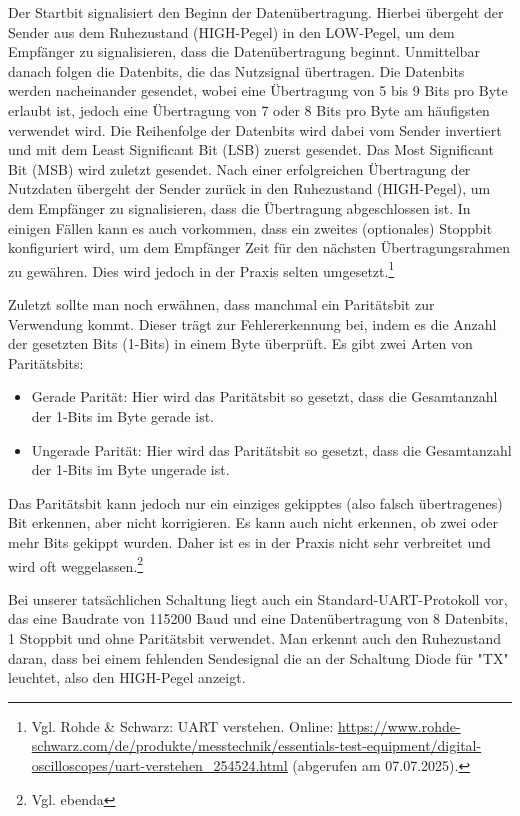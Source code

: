 Der Startbit signalisiert den Beginn der Datenübertragung. Hierbei übergeht der Sender aus dem Ruhezustand (HIGH-Pegel) in den LOW-Pegel, um dem Empfänger zu signalisieren, dass die Datenübertragung beginnt. 
Unmittelbar danach folgen die Datenbits, die das Nutzsignal übertragen. Die Datenbits werden nacheinander gesendet, wobei eine Übertragung von 5 bis 9 Bits pro Byte erlaubt ist, jedoch eine Übertragung von 7 oder 8 Bits pro Byte am häufigsten verwendet wird. Die Reihenfolge der Datenbits wird dabei vom Sender invertiert und mit dem Least Significant Bit (LSB) zuerst gesendet. Das Most Significant Bit (MSB) wird zuletzt gesendet.
Nach einer erfolgreichen Übertragung der Nutzdaten übergeht der Sender zurück in den Ruhezustand (HIGH-Pegel), um dem Empfänger zu signalisieren, dass die Übertragung abgeschlossen ist.
In einigen Fällen kann es auch vorkommen, dass ein zweites (optionales) Stoppbit konfiguriert wird, um dem Empfänger Zeit für den nächsten Übertragungsrahmen zu gewähren. Dies wird jedoch in der Praxis selten umgesetzt.\footnote{Vgl. Rohde \& Schwarz: UART verstehen. Online: \url{https://www.rohde-schwarz.com/de/produkte/messtechnik/essentials-test-equipment/digital-oscilloscopes/uart-verstehen_254524.html} (abgerufen am 07.07.2025).}

Zuletzt sollte man noch erwähnen, dass manchmal ein Paritätsbit zur Verwendung kommt. Dieser trägt zur Fehlererkennung bei, indem es die Anzahl der gesetzten Bits (1-Bits) in einem Byte überprüft. Es gibt zwei Arten von Paritätsbits: 
\begin{itemize}
    \item Gerade Parität: Hier wird das Paritätsbit so gesetzt, dass die Gesamtanzahl der 1-Bits im Byte gerade ist.
    \item Ungerade Parität: Hier wird das Paritätsbit so gesetzt, dass die Gesamtanzahl der 1-Bits im Byte ungerade ist.
\end{itemize}

Das Paritätsbit kann jedoch nur ein einziges gekipptes (also falsch übertragenes) Bit erkennen, aber nicht korrigieren. Es kann auch nicht erkennen, ob zwei oder mehr Bits gekippt wurden. Daher ist es in der Praxis nicht sehr verbreitet und wird oft weggelassen.\footnote{Vgl. ebenda}

Bei unserer tatsächlichen Schaltung liegt auch ein Standard-UART-Protokoll vor, das eine Baudrate von 115200 Baud und eine Datenübertragung von 8 Datenbits, 1 Stoppbit und ohne Paritätsbit verwendet. Man erkennt auch den Ruhezustand daran, dass bei einem fehlenden Sendesignal die an der Schaltung Diode für "TX" leuchtet, also den HIGH-Pegel anzeigt.

